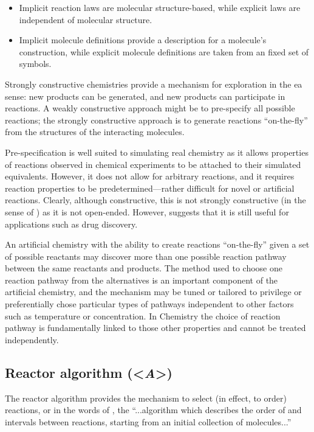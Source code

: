 \begin{itemize}
	\item Implicit reaction laws are molecular structure-based, while explicit laws are independent of molecular structure.
	\item Implicit molecule definitions provide a description for a molecule's construction, while explicit molecule definitions are taken from an fixed set of symbols.
\end{itemize}

Strongly constructive chemistries provide a mechanism for exploration in the \gls{ea} sense: new products can be generated, and new products can participate in reactions. A weakly constructive approach might be to pre-specify all possible reactions; the strongly constructive approach is to generate reactions ``on-the-fly'' from the structures of the interacting molecules. 

Pre-specification is well suited to simulating real chemistry as it allows properties of reactions observed in chemical experiments to be attached to their simulated equivalents. However, it does not allow for arbitrary reactions, and it requires reaction properties to be predetermined---rather difficult for novel or artificial reactions. Clearly, although constructive, this is not strongly constructive (in the sense of \textcite{Fontana1994,Dittrich:2001zr}) as it is not open-ended. However, \textcite{Hartenfeller2011} suggests that it is still useful for applications such as drug discovery.

An artificial chemistry with the ability to create reactions ``on-the-fly'' given a set of possible reactants may discover more than one possible reaction pathway between the same reactants and products. The method used to choose one reaction pathway from the alternatives is an important component of the artificial chemistry, and the mechanism may be tuned or tailored to privilege or preferentially chose particular types of pathways independent to other factors such as temperature or concentration. In Chemistry the choice of reaction pathway is fundamentally linked to those other properties and cannot be treated independently.

\subsection{Reactor algorithm (\textless{}\emph{A}\textgreater{})}

The reactor algorithm provides the mechanism to select (in effect, to order) reactions, or in the words of \textcite[sect. 4.1.3]{Faulconbridge2011}, the ``...algorithm which describes the order of and intervals between reactions, starting from an initial collection of molecules...''

